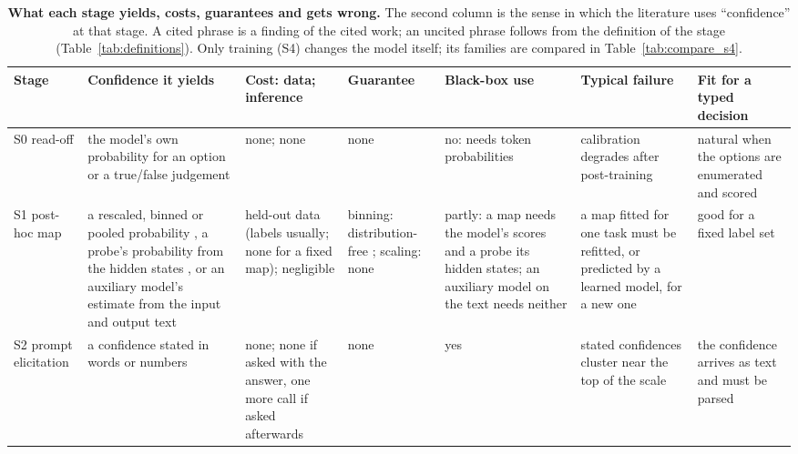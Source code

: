 \begin{table}[tp]
\centering\footnotesize
\setlength{\tabcolsep}{2pt}\renewcommand{\arraystretch}{1.06}
\caption{\textbf{What each stage yields, costs, guarantees and gets wrong.} The second column is the sense in which the
literature uses ``confidence'' at that stage. A cited phrase is a finding of the cited work; an uncited phrase follows from
the definition of the stage (Table~\ref{tab:definitions}). Only training (S4) changes the model itself; its families are
compared in Table~\ref{tab:compare_s4}.}
\label{tab:stage_limits}
\begin{tabular}{@{}>{\raggedright\arraybackslash}p{}>{\raggedright\arraybackslash}p{}>{\raggedright\arraybackslash}p{}>{\raggedright\arraybackslash}p{}>{\raggedright\arraybackslash}p{}>{\raggedright\arraybackslash}p{}>{\raggedright\arraybackslash}p{}@{}}
\toprule
\textbf{Stage} & \textbf{Confidence it yields} & \textbf{Cost: data; inference} & \textbf{Guarantee} & \textbf{Black-box use} & \textbf{Typical failure} & \textbf{Fit for a typed decision} \\
\midrule
S0 read-off & the model's own probability for an option or a true/false judgement \citep{kadavath2022language} & none; none & none & no: needs token probabilities & calibration degrades after post-training \citep{openai2023gpt4} & natural when the options are enumerated and scored \citep{kadavath2022language} \\
S1 post-hoc map & a rescaled, binned or pooled probability \citep{guo2017calibration}, a probe's probability from the hidden states \citep{azaria2023internal}, or an auxiliary model's estimate from the input and output text \citep{ulmer2024calibrating} & held-out data (labels usually; none for a fixed map); negligible & binning: distribution-free \citep{gupta2021distribution}; scaling: none & partly: a map needs the model's scores and a probe its hidden states; an auxiliary model on the text needs neither & a map fitted for one task must be refitted, or predicted by a learned model, for a new one \citep{shen2024thermometer} & good for a fixed label set \citep{guo2017calibration} \\
S2 prompt elicitation & a confidence stated in words or numbers \citep{tian2023just} & none; none if asked with the answer, one more call if asked afterwards & none & yes & stated confidences cluster near the top of the scale \citep{xiong2023can} & the confidence arrives as text and must be parsed \\

\end{tabular}
\end{table}
